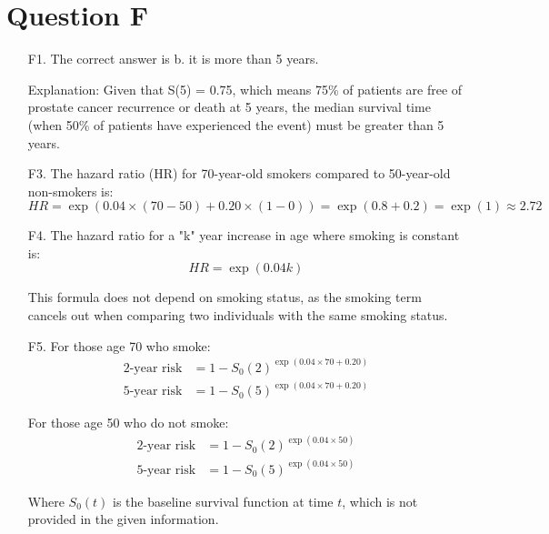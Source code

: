 \documentclass{article}
\begin{document}
\section{Question F}
\begin{enumerate}
    \item[F1.] The correct answer is b. it is more than 5 years.
    
    Explanation: Given that S(5) = 0.75, which means 75\% of patients are free of prostate cancer recurrence or death at 5 years, the median survival time (when 50\% of patients have experienced the event) must be greater than 5 years.

    \item[F3.] The hazard ratio (HR) for 70-year-old smokers compared to 50-year-old non-smokers is:
    \[ HR = \exp(0.04 \times (70-50) + 0.20 \times (1-0)) = \exp(0.8 + 0.2) = \exp(1) \approx 2.72 \]

    \item[F4.] The hazard ratio for a "k" year increase in age where smoking is constant is:
    \[ HR = \exp(0.04k) \]
    
    This formula does not depend on smoking status, as the smoking term cancels out when comparing two individuals with the same smoking status.

    \item[F5.] For those age 70 who smoke:
    \begin{align*}
    2\text{-year risk} &= 1 - S_0(2)^{\exp(0.04 \times 70 + 0.20)} \\
    5\text{-year risk} &= 1 - S_0(5)^{\exp(0.04 \times 70 + 0.20)}
    \end{align*}
    
    For those age 50 who do not smoke:
    \begin{align*}
    2\text{-year risk} &= 1 - S_0(2)^{\exp(0.04 \times 50)} \\
    5\text{-year risk} &= 1 - S_0(5)^{\exp(0.04 \times 50)}
    \end{align*}
    
    Where $S_0(t)$ is the baseline survival function at time $t$, which is not provided in the given information.
\end{enumerate}
\end{document}

